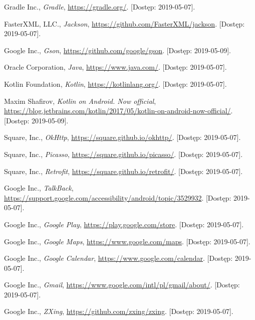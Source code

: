 \documentclass{pracamgr}
\begin{document}
\begin{thebibliography}{99}
 Gradle Inc., \textit{Gradle},	\url{https://gradle.org/}. [Dostęp: 2019-05-07].

 FasterXML, LLC., \textit{Jackson},
	\url{https://github.com/FasterXML/jackson}. [Dostęp: 2019-05-07].

 Google Inc., \textit{Gson},	\url{https://github.com/google/gson}. [Dostęp: 2019-05-09].

 Oracle Corporation, \textit{Java}, \url{https://www.java.com/}. [Dostęp: 2019-05-07].

 Kotlin Foundation, \textit{Kotlin}, \url{https://kotlinlang.org/}. [Dostęp: 2019-05-07].

 Maxim Shafirov, \textit{Kotlin on Android. Now official},
	\url{https://blog.jetbrains.com/kotlin/2017/05/kotlin-on-android-now-official/}. [Dostęp: 2019-05-09].

 Square, Inc., \textit{OkHttp},	\url{https://square.github.io/okhttp/}. [Dostęp: 2019-05-07].

 Square, Inc., \textit{Picasso}, \url{https://square.github.io/picasso/}. [Dostęp: 2019-05-07].

 Square, Inc., \textit{Retrofit}, \url{https://square.github.io/retrofit/}. [Dostęp: 2019-05-07].

 Google Inc., \textit{TalkBack}, \url{https://support.google.com/accessibility/android/topic/3529932}. [Dostęp: 2019-05-07].

 Google Inc., \textit{Google Play},	\url{https://play.google.com/store}. [Dostęp: 2019-05-07].

 Google Inc., \textit{Google Maps},	\url{https://www.google.com/maps}. [Dostęp: 2019-05-07].

 Google Inc., \textit{Google Calendar},	\url{https://www.google.com/calendar}. [Dostęp: 2019-05-07].

 Google Inc., \textit{Gmail}, \url{https://www.google.com/intl/pl/gmail/about/}. [Dostęp: 2019-05-07].

 Google Inc., \textit{ZXing}, \url{https://github.com/zxing/zxing}. [Dostęp: 2019-05-07].

\end{thebibliography}
\end{document}
